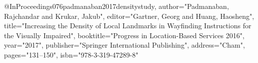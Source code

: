 @InProceedings{076padmanaban2017densitystudy,
author="Padmanaban, Rajchandar
and Krukar, Jakub",
editor="Gartner, Georg
and Huang, Haosheng",
title="Increasing the Density of Local Landmarks in Wayfinding Instructions for the Visually Impaired",
booktitle="Progress in Location-Based Services 2016",
year="2017",
publisher="Springer International Publishing",
address="Cham",
pages="131--150",
isbn="978-3-319-47289-8"
}